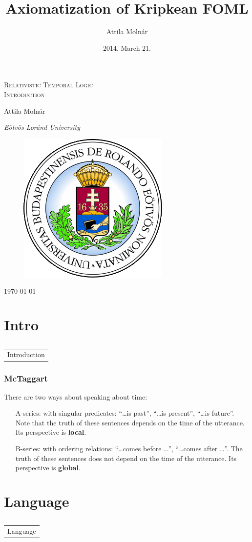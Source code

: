 \documentclass[xcolor=x11names]{beamer}
\author{Attila Moln\'ar}
\date{2014. March 21.}
\title{Axiomatization of Kripkean FOML}
\institute{ELTE}
\makeatletter
\let\beamer@writeslidentry@miniframeson=\beamer@writeslidentry
\def\beamer@writeslidentry@miniframesoff{%
  \expandafter\beamer@ifempty\expandafter{\beamer@framestartpage}{}%
  {%
    \clearpage\beamer@notesactions%
  }
}
\newcommand*{\miniframeson}{\let\beamer@writeslidentry=\beamer@writeslidentry@miniframeson}
\newcommand*{\miniframesoff}{\let\beamer@writeslidentry=\beamer@writeslidentry@miniframesoff}
\newcommand{\cimdia}[1] {\miniframesoff \begin{frame}\begin{center}\huge \begin{tabular}{c}#1\end{tabular}\end{center}\end{frame}\miniframeson}
\newcommand{\szakasz}[2][]{\section{#1}\subsection{}\cimdia{#2}}
\renewcommand{\emph}[1]{\textbf{#1}}
\makeatother
\begin{document}
\begin{frame}
\centering
\textsc{\Large Relativistic Temporal Logic \\[1em] Introduction}

\bigskip

{ \small Attila Moln\'ar

    \textit{E\"otv\"os Lor\'and University}}

 \begin{figure}
\includegraphics[scale=.3]{elte_cimer.png}
 \end{figure}

	\today
\end{frame}

\szakasz[Intro]{Introduction}

\begin{frame}
	\frametitle{McTaggart}
\footnotesize
There are two ways about speaking about time:
\begin{itemize}
\item[A-series:] with singular predicates: ``\dots is past'', ``\dots is present'', ``\dots is future''. Note that the truth of these sentences depends on the time of the utterance. Its perspective is \emph{local}.
\item[B-series:] with ordering relations: ``\dots comes before \dots'', ``\dots comes after \dots''. The truth of these sentences does not depend on the time of the utterance. Its perspective is \emph{global}.
\end{itemize}
\end{frame}



\szakasz[Language]{Language}
\end{document}
